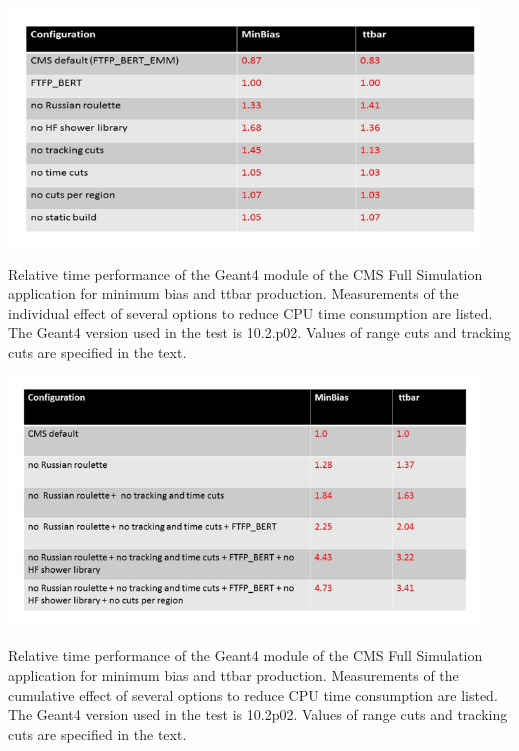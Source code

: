 \documentclass[12pt,a4paper]{article}
\begin{document}
{\begin{table}[bthp]
\vspace*{0.3cm}
\centering
\includegraphics[width=0.94\textwidth]{image16.png}
\caption{Relative time performance of the Geant4 module of the CMS Full
Simulation application for minimum bias and ttbar production.
Measurements of the individual effect of several options to reduce CPU
time consumption are listed. The Geant4 version used in the test is
10.2.p02. Values of range cuts and tracking cuts are specified in the
text.}
\label{table:table2}
\end{table}

\begin{table}[bthp]
\vspace*{0.3cm}
\centering
\includegraphics[width=0.94\textwidth]{image17.png}
\caption{Relative time performance of the Geant4 module of the CMS Full
Simulation application for minimum bias and ttbar production.
Measurements of the cumulative effect of several options to reduce CPU
time consumption are listed. The Geant4 version used in the test is
10.2p02. Values of range cuts and tracking cuts are specified in the text.}
\label{table:table3}
\end{table}

}
\end{document}
